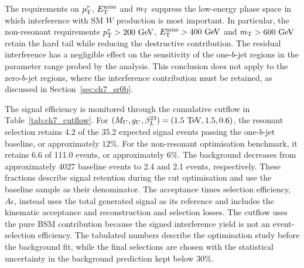 The requirements on $p_{\mathrm{T}}^\tau$, $E_{\mathrm{T}}^{\mathrm{miss}}$ and $m_{\mathrm{T}}$ suppress the low-energy phase space in which interference with SM $W$ production is most important.
In particular, the non-resonant requirements $p_{\mathrm{T}}^\tau>200~\mathrm{GeV}$, $E_{\mathrm{T}}^{\mathrm{miss}}>400~\mathrm{GeV}$ and $m_{\mathrm{T}}>600~\mathrm{GeV}$ retain the hard tail while reducing the destructive contribution.
The residual interference has a negligible effect on the sensitivity of the one-$b$-jet regions in the parameter range probed by the analysis.
This conclusion does not apply to the zero-$b$-jet regions, where the interference contribution must be retained, as discussed in Section~\ref{sec:ch7_sr0b}.

The signal efficiency is monitored through the cumulative cutflow in Table~\ref{tab:ch7_cutflow}.
For $(M_U,g_U,\beta_L^{23})=(1.5~\mathrm{TeV},1.5,0.6)$, the resonant selection retains 4.2 of the 35.2 expected signal events passing the one-$b$-jet baseline, or approximately $12\%$.
For the non-resonant optimisation benchmark, it retains 6.6 of 111.0 events, or approximately $6\%$.
The background decreases from approximately 4027 baseline events to 2.4 and 2.1 events, respectively.
These fractions describe signal retention during the cut optimisation and use the baseline sample as their denominator.
The acceptance times selection efficiency, $A\epsilon$, instead uses the total generated signal as its reference and includes the kinematic acceptance and reconstruction and selection losses.
The cutflow uses the pure BSM contribution because the signed interference yield is not an event-selection efficiency.
The tabulated numbers describe the optimisation study before the background fit, while the final selections are chosen with the statistical uncertainty in the background prediction kept below $30\%$.

